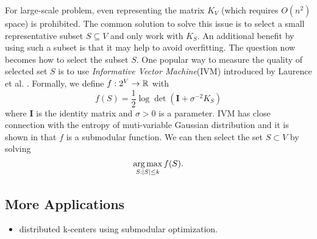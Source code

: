 For large-scale problem, even representing the matrix $K_V$ (which requires $O(n^2)$ space) is prohibited. The common solution to solve this issue is to select a small representative subset $S \subseteq V$ and only work with $K_S$. An additional benefit by using such a subset is that it may help to avoid overfitting. The question now becomes how to select the subset $S$. One popular way to measure the quality of selected set $S$ is to use \emph{Informative Vector Machine}(IVM) introduced by Laurence et al. \cite{LSH03}. Formally, we define $f: 2^V \rightarrow \mathbb{R}$ with
$$f(S) = \frac{1}{2} \log\det\left( \mathbf{I} + \sigma^{-2} K_S \right)$$
where $\mathbf{I}$ is the identity matrix and $\sigma > 0$ is a parameter. IVM has close connection with the entropy of  muti-variable Gaussian distribution \cite{B14} and it is shown in \cite{S04,B14} that $f$ is a submodular function. We can then select the set $S\subset V$ by solving
$$\operatorname*{arg\,max}_{S:|S|\leq k} f(S).$$


\subsection{More Applications}



\begin{itemize}
\item \cite{MKC+15} distributed k-centers using submodular optimization.
\end{itemize}

